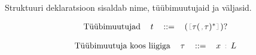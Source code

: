 \documentclass[12pt]{article}
\begin{document}
    Struktuuri deklaratsioon sisaldab nime, tüübimuutujaid ja väljasid.

    \begin{equation*}
      \begin{tabular}{llll}
        Tüübimuutujad & $t$ & $::=$ & $(${\color{helehall}\verb![!}$\tau(${\color{helehall}\verb!,!}$\tau)^*${\color{helehall}\verb!]!}$)?$
      \end{tabular}
    \end{equation*}

    

    \begin{equation*}
      \begin{tabular}{llll}
        Tüübimuutuja koos liigiga & $\tau$ & $::=$ & $x$ {\color{helehall}\verb!:!} $L$
      \end{tabular}
    \end{equation*}
\end{document}
